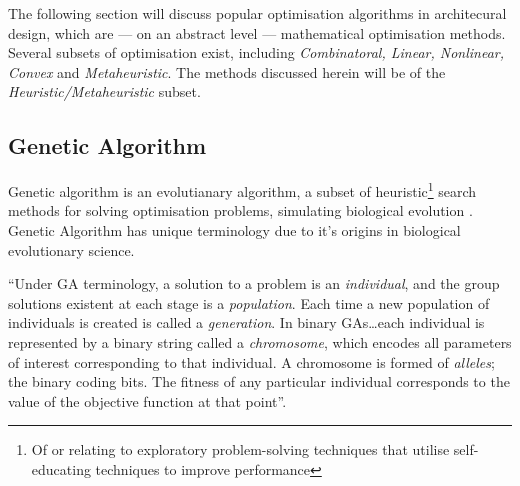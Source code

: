 The following section will discuss popular optimisation algorithms in architecural design, which are --- on an abstract level --- mathematical optimisation methods. Several subsets of optimisation exist, including \emph{Combinatoral, Linear, Nonlinear, Convex} and \emph{Metaheuristic}. The methods discussed herein will be of the \emph{Heuristic/Metaheuristic} subset.

\clearpage
\subsection{Genetic Algorithm}
\label{subsec:GA}

Genetic algorithm is an evolutianary algorithm, a subset of heuristic\footnote{Of or relating to exploratory problem-solving techniques that utilise self-educating techniques to improve performance\cite{merriam03}} search methods for solving optimisation problems, simulating biological evolution \cite{fasoulaki08}. Genetic Algorithm has unique terminology due to it's origins in biological evolutionary science.

``Under GA terminology, a solution to a problem is an \emph{individual}, and the group solutions existent at each stage is a \emph{population}. Each time a new population of individuals is created is called a \emph{generation}. In binary GAs\ldots each individual is represented by a binary string called a \emph{chromosome}, which encodes all parameters of interest corresponding to that individual. A chromosome is formed of \emph{alleles}; the binary coding bits. The fitness of any particular individual corresponds to the value of the objective function at that point''. \cite{caldas01}

